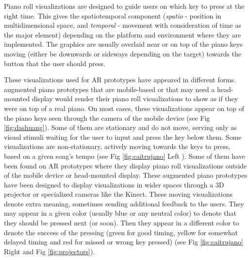 \documentclass[sigchi, review]{acmart}
\begin{document}
Piano roll visualizations are designed to guide users on which key to press at the right time. This gives the spatiotemporal component (\textit{spatio} - position in multidimensional space, and \textit{temporal} - movement with consideration of time as the major element) depending on the platform and environment where they are implemented. The graphics are usually overlaid near or on top of the piano keys moving (either be downwards or sideways depending on the target) towards the button that the user should press. 

These visualizations used for AR prototypes have appeared in different forms. augmented piano prototypes that are mobile-based or that may need a head-mounted display would render their piano roll visualizations to show as if they were on top of a real piano. On most cases, these visualizations appear on top of the piano keys seen through the camera of the mobile device (see Fig \ref{fig:dashuang}). Some of them are stationary and do not move, serving only as visual stimuli waiting for the user to input and press the key below them. Some visualizations are non-stationary, actively moving towards the keys to press, based on a given song's tempo (see Fig \ref{fig:caitrujano} Left ). Some of them have been found on AR prototypes where they display piano roll visualizations outside of the mobile device or head-mounted display. These augmented piano prototypes have been designed to display visualizations in wider spaces through a 3D projector or specialized cameras like the Kinect. These moving visualizations denote extra meaning, sometimes sending additional feedback to the users. They may appear in a given color (usually blue or any neutral color) to denote that they should be pressed next (or soon). Then they appear in a different color to denote the success of the pressing (green for good timing, yellow for somewhat delayed timing and red for missed or wrong key pressed) (see Fig \ref{fig:caitrujano} Right and Fig \ref{fig:projectors}). 
\end{document}
